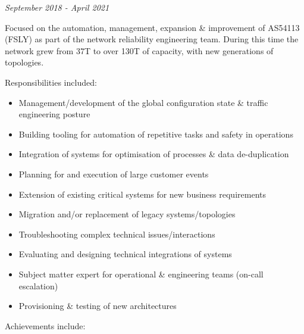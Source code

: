 \emph{September 2018 - April 2021}

Focused on the automation, management, expansion \& improvement of
AS54113 (FSLY) as part of the network reliability engineering team.
During this time the network grew from 37T to over 130T of capacity,
with new generations of topologies.

Responsibilities included:

\begin{itemize}
\tightlist
\item
  Management/development of the global configuration state \& traffic
  engineering posture
\item
  Building tooling for automation of repetitive tasks and safety in
  operations
\item
  Integration of systems for optimisation of processes \& data
  de-duplication
\item
  Planning for and execution of large customer events
\item
  Extension of existing critical systems for new business requirements
\item
  Migration and/or replacement of legacy systems/topologies
\item
  Troubleshooting complex technical issues/interactions
\item
  Evaluating and designing technical integrations of systems
\item
  Subject matter expert for operational \& engineering teams (on-call
  escalation)
\item
  Provisioning \& testing of new architectures
\end{itemize}

Achievements include:

